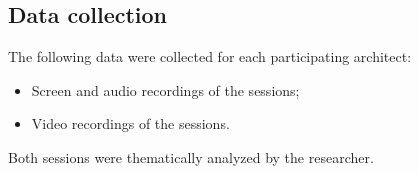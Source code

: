 \subsection{Data collection}
The following data were collected for each participating architect:
\begin{itemize}
    \item Screen and audio recordings of the sessions; 
    \item Video recordings of the sessions.
\end{itemize}

Both sessions were thematically analyzed by the researcher.